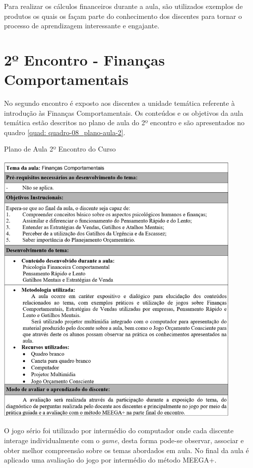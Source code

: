 Para realizar os cálculos financeiros durante a aula, são utilizados exemplos de produtos os quais os façam parte do conhecimento dos discentes para tornar o processo de aprendizagem interessante e engajante.

\section{2º Encontro - Finanças Comportamentais}
No segundo encontro é exposto aos discentes a unidade temática referente à introdução às Finanças Comportamentais. Os conteúdos e os objetivos da aula temática estão descritos no plano de aula do 2º encontro e são apresentados no quadro \ref{quad: quadro-08_plano-aula-2}.

\newpage

\graphicspath{{quadros/}} 
\begin{quadro}[!ht]
\centering
\begin{minipage}{1.\textwidth}
\caption{Plano de Aula 2º Encontro do Curso}
\centering
\includegraphics[width=0.9\textwidth]{quadro-08_plano-aula-2.PNG}
\label{quad: quadro-08_plano-aula-2}
\end{minipage}
\end{quadro}

O jogo sério foi utilizado por intermédio do computador onde cada discente interage individualmente com o \textit{game}, desta forma pode-se observar, associar e obter melhor compreensão sobre os temas abordados em aula. No final da aula é aplicado uma avaliação do jogo por intermédio do método MEEGA+.

